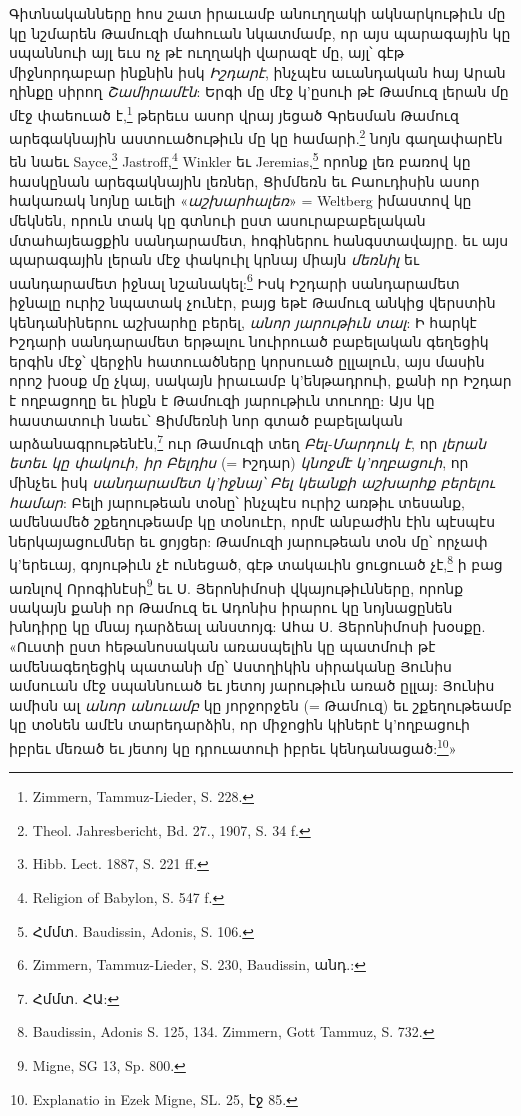 \documentclass{article}
\begin{document}
{Գիտնականները հոս շատ իրաւամբ անուղղակի ակնարկութիւն մը կը նշմարեն Թամուզի մահուան նկատմամբ, որ այս պարագային կը սպաննուի այլ եւս ոչ թէ ուղղակի վարազէ մը, այլ՝ գէթ միջնորդաբար ինքնին իսկ \emph{Իշդարէ}, ինչպէս աւանդական հայ Արան ղինքը սիրող \emph{Շամիրամէն}: Երգի մը մէջ կ'ըսուի թէ Թամուզ լերան մը մէջ փաեուած է,\footnote{Zimmern, Tammuz-Lieder, S. 228.} թերեւս ասոր վրայ յեցած Գրեսման Թամուզ արեգակնային աստուածութիւն մը կը համարի.\footnote{Theol. Jahresbericht, Bd. 27., 1907, S. 34 f.} նոյն գաղափարէն են նաեւ Sayce,\footnote{Hibb. Lect. 1887, S. 221 ff.} Jastroff,\footnote{Religion of Babylon, S. 547 f.} Winkler եւ Jeremias,\footnote{Հմմտ. Baudissin, Adonis, S. 106.} որոնք լեռ բառով կը հասկընան արեգակնային լեռներ, Ցիմմեռն եւ Բաուդիսին ասոր հակառակ նոյնը աւելի «\emph{աշխարհալեռ}» = Weltberg իմաստով կը մեկնեն, որուն տակ կը գտնուի ըստ ասուրաբաբելական մտահայեացքին սանդարամետ, հոգիներու հանգստավայրը. եւ այս պարագային լերան մէջ փակուիլ կրնայ միայն \emph{մեռնիլ} եւ սանդարամետ իջնալ նշանակել:\footnote{Zimmern, Tammuz-Lieder, S. 230, Baudissin, անդ.:} Իսկ Իշդարի սանդարամետ իջնալը ուրիշ նպատակ չունէր, բայց եթէ Թամուզ անկից վերստին կենդանիներու աշխարհը բերել, \emph{անոր յարութիւն տալ}: Ի հարկէ Իշդարի սանդարամետ երթալու նուիրուած բաբելական գեղեցիկ երգին մէջ՝ վերջին հատուածները կորսուած ըլլալուն, այս մասին որոշ խօսք մը չկայ, սակայն իրաւամբ կ'ենթադրուի, քանի որ Իշդար է ողբացողը եւ ինքն է Թամուզի յարութիւն տուողը: Այս կը հաստատուի նաեւ՝ Ցիմմեռնի նոր գտած բաբելական արձանագրութենէն,\footnote{Հմմտ. ՀԱ:} ուր Թամուզի տեղ \emph{Բել-Մարդուկ է}, որ \emph{լերան ետեւ կը փակուի, իր Բելդիս} (= Իշդար) \emph{կնոջմէ կ'ողբացուի}, որ մինչեւ իսկ \emph{սանդարամետ կ'իջնայ՝ Բել կեանքի աշխարհք բերելու համար}: Բելի յարութեան տօնը՝ ինչպէս ուրիշ առթիւ տեսանք, ամենամեծ շքեղութեամբ կը տօնուէր, որմէ անբաժին էին պէսպէս ներկայացումներ եւ ցոյցեր: Թամուզի յարութեան տօն մը՝ որչափ կ'երեւայ, գոյութիւն չէ ունեցած, գէթ տակաւին ցուցուած չէ,\footnote{Baudissin, Adonis S. 125, 134. Zimmern, Gott Tammuz, S. 732.} ի բաց առնլով Որոգինէսի\footnote{Migne, SG 13, Sp. 800.} եւ Ս. Յերոնիմոսի վկայութիւնները, որոնք սակայն քանի որ Թամուզ եւ Ադոնիս իրարու կը նոյնացընեն խնդիրը կը մնայ դարձեալ անստոյգ: Ահա Ս. Յերոնիմոսի խօսքը. «Ուստի ըստ հեթանոսական առասպելին կը պատմուի թէ ամենագեղեցիկ պատանի մը՝ Աստղիկին սիրականը Յունիս ամսուան մէջ սպաննուած եւ յետոյ յարութիւն առած ըլլայ: Յունիս ամիսն ալ \emph{անոր անուամբ} կը յորջորջեն (= Թամուզ) եւ շքեղութեամբ կը տօնեն ամէն տարեդարձին, որ միջոցին կիներէ կ'ողբացուի իբրեւ մեռած եւ յետոյ կը դրուատուի իբրեւ կենդանացած:\footnote{Explanatio in Ezek Migne, SL. 25, էջ 85.}»

}
\end{document}
